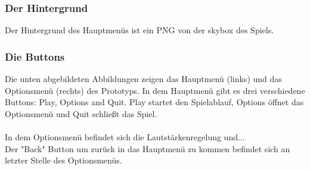 \subsubsection{Der Hintergrund}
Der Hintergrund des Hauptmenüs ist ein PNG von der \gls{skybox} des Spiels. 

\subsubsection{Die Buttons}
Die unten abgebildeten Abbildungen zeigen das Hauptmenü (links) und das Optionsmenü (rechts) des Prototyps. In dem Hauptmenü gibt es drei verschiedene Buttons: Play, Options and Quit. Play startet den Spielablauf, Options öffnet das Optionsmenü und Quit schließt das Spiel.\\\\
In dem Optionsmenü befindet sich die Lautstärkenregelung und... \\
Der "Back" Button um zurück in das Hauptmenü zu kommen befindet sich an letzter Stelle des Optionsmenüs.


